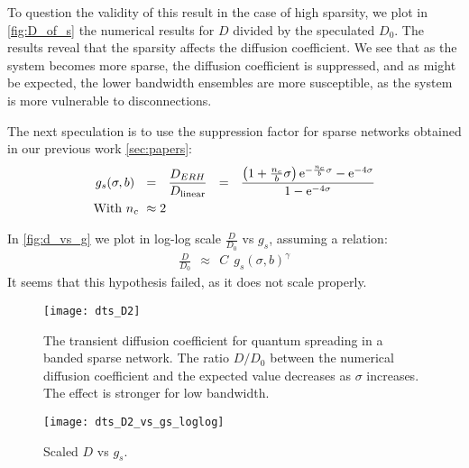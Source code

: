 To question the validity of this result in the case of high sparsity,
we plot in \autoref{fig:D_of_s} the numerical results for $D$ divided by 
the speculated $D_0$. The results reveal that the sparsity affects the diffusion coefficient.
We see that as the system becomes more sparse, the diffusion coefficient is suppressed,
and as might be expected, the lower bandwidth ensembles are more
susceptible, as the system is more vulnerable to disconnections.


The next speculation is to use the suppression factor for sparse networks 
obtained in our previous work \autoref{sec:papers}:
%
\begin{align}
g_s(\sigma, b)\ \ &=\ \ \frac{D_{ERH}}{D_{\textrm{linear}}}\ \ =\ \ 
\frac{  \left(1+\frac{n_c}{b}\sigma\right)\eexp{-\frac{n_c}{b}\sigma}
                                              - \eexp{-4\sigma}}{1-\eexp{-4\sigma}}\\
\textrm{With } n_c\ &\approx 2
\end{align}

In \autoref{fig:d_vs_g} we plot in log-log scale $\frac{D}{D_0}$ vs $g_s$, assuming a relation:
%
\begin{align}
\frac{D}{D_0}\ \ \approx \ \ C\ \ g_s(\sigma,b)^\gamma
\end{align}
It seems that this hypothesis failed, as it does not scale properly.


\begin{figure}
\texttt{[image: dts\_D2]}
\caption{The transient diffusion coefficient for quantum spreading in
a banded sparse network. The ratio $D/D_0$ between the numerical diffusion 
coefficient and the expected value decreases as $\sigma$ increases. The effect
is stronger for low bandwidth.}\label{fig:D_of_s}
\end{figure}


\begin{figure}
\texttt{[image: dts\_D2\_vs\_gs\_loglog]}
\caption{Scaled $D$ vs $g_s$. }\label{fig:d_vs_g}
\end{figure}
